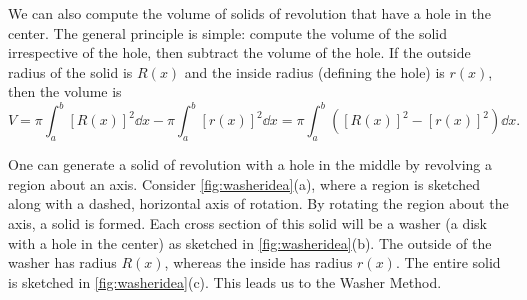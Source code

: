 

We can also compute the volume of solids of revolution that have a hole in the center. The general principle is simple: compute the volume of the solid irrespective of the hole, then subtract the volume of the hole. If the outside radius of the solid is $R(x)$ and the inside radius (defining the hole) is $r(x)$, then the volume is 
\[
V = \pi\int_a^b [R(x)]^2 \dd x - \pi\int_a^b [r(x)]^2\dd x
= \pi\int_a^b \left([R(x)]^2-[r(x)]^2\right)\dd x.
\]

One can generate a solid of revolution with a hole in the middle by revolving a region about an axis. Consider \autoref{fig:washeridea}(a), where a region is sketched along with a dashed, horizontal axis of rotation. By rotating the region about the axis, a solid is formed. Each cross section of this solid will be a washer (a disk with a hole in the center) as sketched in \autoref{fig:washeridea}(b). The outside of the washer has radius $R(x)$, whereas the inside has radius $r(x)$. The entire solid is sketched in \autoref{fig:washeridea}(c).  This leads us to the Washer Method.

